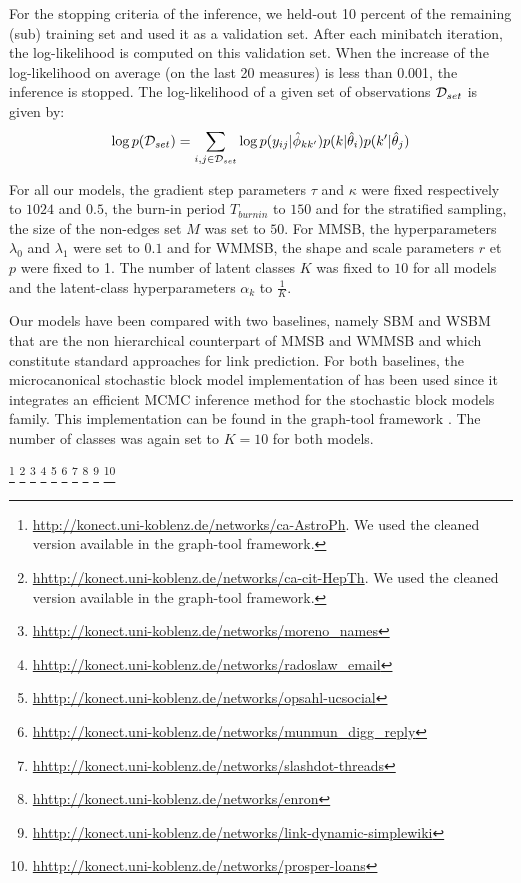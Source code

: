 For the stopping criteria of the inference, we  held-out 10 percent of the remaining (sub) training set and used it as a validation set. After each minibatch iteration,  the log-likelihood is computed on this validation set. When the increase of the log-likelihood on average (on the last 20 measures) is less than 0.001, the inference is stopped. The log-likelihood of a given set of observations $\mathcal{D}_{set}$  is given by:
\begin{equation*}
\log p(\mathcal{D}_{set}) = \sum_{i,j \in \mathcal{D}_{set}} \log p(y_{ij} | \hat\phi_{kk'}) p(k|\hat\theta_i) p(k'|\hat\theta_j)
\end{equation*}

For all our models, the gradient step parameters  $\tau$ and $\kappa$ were fixed respectively to  $1024$ and $0.5$, the burn-in period $T_{burnin}$ to $150$ and for the stratified sampling, the size of the non-edges set  $M$ was set to $50$. For MMSB, the hyperparameters $\lambda_0$ and $\lambda_1$ were set to $0.1$ and for WMMSB, the shape and scale parameters $r$ et $p$ were fixed to 1. The number of latent classes $K$ was fixed to $10$ for all models and the latent-class hyperparameters $\alpha_k$ to $\frac{1}{K}$.


Our models have been compared with two baselines, namely SBM and WSBM that are the non hierarchical counterpart of MMSB and WMMSB and which constitute standard approaches for link prediction. For both baselines, the microcanonical stochastic block model implementation of \cite{peixoto2018nonparametric} has been used since it integrates an efficient MCMC inference method for the stochastic block models family. This implementation can be found in the graph-tool framework \cite{peixoto_graph-tool_2014}. The number of classes was again set to $K=10$ for both models.


\textcolor{white}{ %
\footnote{\url{http://konect.uni-koblenz.de/networks/ca-AstroPh}. We used the cleaned version available in the  graph-tool framework.}
\footnote{\url{hhttp://konect.uni-koblenz.de/networks/ca-cit-HepTh}. We used the cleaned version available in the  graph-tool framework.}
\footnote{\url{hhttp://konect.uni-koblenz.de/networks/moreno_names}}
\footnote{\url{hhttp://konect.uni-koblenz.de/networks/radoslaw_email}}
\footnote{\url{hhttp://konect.uni-koblenz.de/networks/opsahl-ucsocial}}
\footnote{\url{hhttp://konect.uni-koblenz.de/networks/munmun_digg_reply}}
\footnote{\url{hhttp://konect.uni-koblenz.de/networks/slashdot-threads}}
\footnote{\url{hhttp://konect.uni-koblenz.de/networks/enron}}
\footnote{\url{hhttp://konect.uni-koblenz.de/networks/link-dynamic-simplewiki}}
\footnote{\url{hhttp://konect.uni-koblenz.de/networks/prosper-loans}}
}
\begin{figure}[h]
\centering
	
   \label{fig:roc}
\end{figure}


